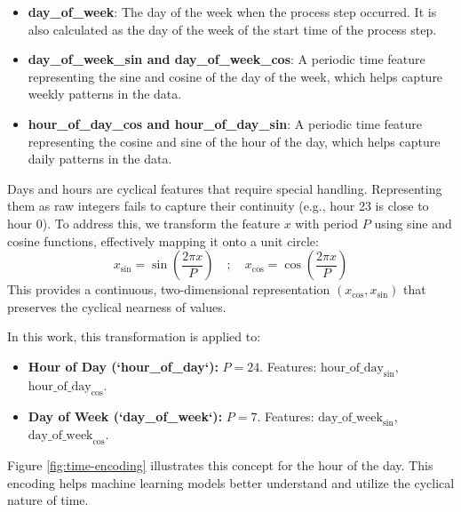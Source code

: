 \begin{itemize}
  \item \textbf{day\_of\_week}: The day of the week when the process step occurred. It is also calculated as the day of the week of the start time of the process step.
  \item \textbf{day\_of\_week\_sin and day\_of\_week\_cos}: A periodic time feature representing the sine and cosine of the day of the week, which helps capture weekly patterns in the data.
  \item \textbf{hour\_of\_day\_cos and hour\_of\_day\_sin}: A periodic time feature representing the cosine and sine of the hour of the day, which helps capture daily patterns in the data.
\end{itemize}

Days and hours are cyclical features that require special handling. Representing them as raw integers fails to capture their continuity (e.g., hour 23 is close to hour 0). To address this, we transform the feature $x$ with period $P$ using sine and cosine functions, effectively mapping it onto a unit circle:
\begin{equation}
  x_{\sin} = \sin\left(\frac{2 \pi x}{P}\right) \quad ; \quad
  x_{\cos} = \cos\left(\frac{2 \pi x}{P}\right)
  \label{eq:sincos_transform}
\end{equation}
This provides a continuous, two-dimensional representation $(x_{\cos}, x_{\sin})$ that preserves the cyclical nearness of values.

In this work, this transformation is applied to:

\begin{itemize}
  \item \textbf{Hour of Day (`hour\_of\_day`):} $P=24$. Features: $\text{hour\_of\_day}_{\sin}$, $\text{hour\_of\_day}_{\cos}$.
  \item \textbf{Day of Week (`day\_of\_week`):} $P=7$. Features: $\text{day\_of\_week}_{\sin}$, $\text{day\_of\_week}_{\cos}$.
\end{itemize}

Figure \ref{fig:time-encoding} illustrates this concept for the hour of the day. This encoding helps machine learning models better understand and utilize the cyclical nature of time.

